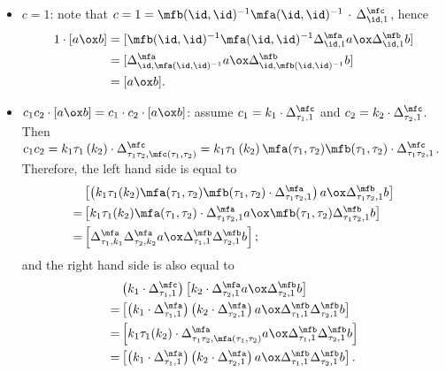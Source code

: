 \begin{construction}[$M$]
\begin{itemize}
  \item $c = 1$: note that $c = 1 = \mfb(\id,\id)^{-1}\mfa(\id,\id)^{-1}\,\cdot\,\Delta^{\mfc}_{\id, 1}$, hence
        \[
        \begin{aligned}
          1 \cdot [a\ox b]
          &= [\mfb(\id,\id)^{-1}\mfa(\id,\id)^{-1}\Delta^{\mfa}_{\id,1}a \ox \Delta^{\mfb}_{\id, 1}b] \\
          &= [\Delta^{\mfa}_{\id,\mfa(\id,\id)^{-1}}a \ox \Delta^{\mfb}_{\id,\mfb(\id,\id)^{-1}}b] \\
          &= [a\ox b].
        \end{aligned}
        \]
  \item $c_{1}c_{2}\cdot [a \ox b] = c_{1}\cdot c_{2}\cdot [a\ox b]$: assume $c_{1} = k_{1}\cdot\Delta^{\mfc}_{\tau_{1}, 1}$ and $c_{2}=k_{2}\cdot\Delta^{\mfc}_{\tau_{2},1}$. Then $c_{1}c_{2} = k_{1}\tau_{1}\left(k_{2}\right)\cdot \Delta^{\mfc}_{\tau_{1}\tau_{2},\mfc(\tau_{1},\tau_{2})} = k_{1}\tau_{1}\left(k_{2}\right)\mfa(\tau_{1},\tau_{2})\mfb(\tau_{1},\tau_{2})\cdot \Delta^{\mfc}_{\tau_{1}\tau_{2},1}$.
        Therefore, the left hand side is equal to
        \[
        \begin{aligned}
          & \left[\left(k_{1}\tau_{1}(k_{2})\mfa(\tau_{1},\tau_{2})\mfb(\tau_{1},\tau_{2})\cdot \Delta^{\mfa}_{\tau_{1}\tau_{2}, 1}\right)a \ox \Delta^{\mfb}_{\tau_{1}\tau_{2},1}b\right] \\
          =& \left[
             k_{1}\tau_{1}(k_{2})\mfa(\tau_{1},\tau_{2})\cdot \Delta^{\mfa}_{\tau_{1}\tau_{2},1} a \ox \mfb(\tau_{1},\tau_{2})\Delta^{\mfb}_{\tau_{1}\tau_{2}, 1}b
             \right]\\
          =& \left[
             \Delta^{\mfa}_{\tau_{1},k_{1}}\Delta^{\mfa}_{\tau_{2},k_{2}} a \ox
             \Delta^{\mfb}_{\tau_{1},1}\Delta^{\mfb}_{\tau_{2},1}b
             \right];
        \end{aligned}
        \]
        and the right hand side is also equal to
        \[
        \begin{aligned}
        &\left(k_{1}\cdot \Delta^{\mfc}_{\tau_{1}, 1}\right)
        \left[
        k_{2}\cdot\Delta^{\mfa}_{\tau_{2},1}a \ox \Delta^{\mfb}_{\tau_{2}, 1} b
          \right] \\
          =& \left[
             \left(k_{1}\cdot \Delta^{\mfa}_{\tau_{1}, 1}\right)\left(k_{2}\cdot\Delta^{\mfa}_{\tau_{2}, 1}\right)a \ox
             \Delta^{\mfb}_{\tau_{1},1}\Delta^{\mfb}_{\tau_{2},1}b
             \right]\\
          =&\left[
           k_{1}\tau_{1}(k_{2})\cdot \Delta^{\mfa}_{\tau_{1}\tau_{2},\mfa(\tau_{1},\tau_{2})}a \ox \Delta^{\mfb}_{\tau_{1}, 1}\Delta^{\mfb}_{\tau_{2},1}b
             \right]\\
          =&\left[
             \left(k_{1}\cdot \Delta^{\mfa}_{\tau_{1}, 1}\right)\left(k_{2}\cdot\Delta^{\mfa}_{\tau_{2}, 1}\right)a \ox
             \Delta^{\mfb}_{\tau_{1},1}\Delta^{\mfb}_{\tau_{2},1}b
             \right].
          \end{aligned}
        \]
\end{itemize}


\end{construction}
